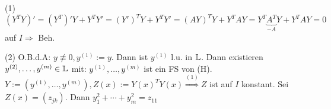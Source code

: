 \documentclass{article}
\begin{document}
\begin{beweise}
\item[(1)] $(Y^T Y)' = (Y^T)'Y + Y^T Y' = (Y')^T Y + Y^T Y' = (AY)^T Y + Y^T AY = Y^T \underbrace{A^T}_{-A} Y + Y^T AY = 0$ auf $I \Rightarrow$ Beh.
\item[(2)] O.B.d.A: $y \not\equiv 0, y^{(1)} := y.$ Dann ist $y^{(1)}$ l.u. in $\mathbb{L}$. Dann existieren $y^{(2)}, \dots , y^{(m)} \in \mathbb{L}$ mit: $y^{(1)}, \dots , y^{(m)}$ ist ein FS von (H). $Y:= (y^{(1)}, \dots , y^{(m)}), Z(x) := Y(x)^T Y(x) \stackrel{(1)}{\Rightarrow} Z$ ist auf $I$ konstant. Sei $Z(x) = (z_{jk}).$ Dann $y_1^2+ \cdots + y_m^2 = z_{11}$
\end{beweise}
\end{document}
